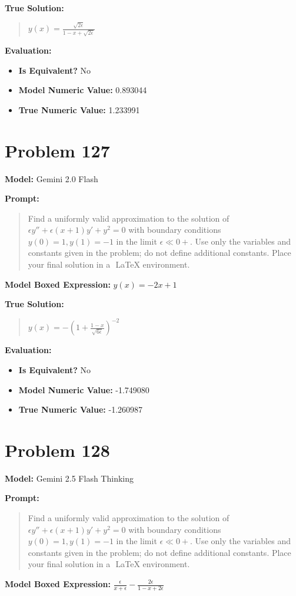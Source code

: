 \documentclass{article}
\begin{document}
{\textbf{True Solution:}
\begin{quote}
$y(x) = \frac{\sqrt{2\epsilon}}{1-x + \sqrt{2\epsilon}}$
\end{quote}

\textbf{Evaluation:}
\begin{itemize}
\item \textbf{Is Equivalent?} No
\item \textbf{Model Numeric Value:} 0.893044
\item \textbf{True Numeric Value:} 1.233991
\end{itemize}
\vspace{1cm}
\section*{Problem 127}
\textbf{Model:} Gemini 2.0 Flash

\textbf{Prompt:}
\begin{quote}
Find a uniformly valid approximation to the solution of $\epsilon y'' + \epsilon (x+1) y' + y^2 = 0$ with boundary conditions $y(0) = 1, y(1) = -1$ in the limit $\epsilon \ll 0+$. Use only the variables and constants given in the problem; do not define additional constants. Place your final solution in a $\boxed{}$ LaTeX environment.
\end{quote}
\textbf{Model Boxed Expression:} $y(x) = -2x+1$

\textbf{True Solution:}
\begin{quote}
$y(x) = -\left(1 + \frac{1-x}{\sqrt{6\epsilon}}\right)^{-2}$
\end{quote}

\textbf{Evaluation:}
\begin{itemize}
\item \textbf{Is Equivalent?} No
\item \textbf{Model Numeric Value:} -1.749080
\item \textbf{True Numeric Value:} -1.260987
\end{itemize}
\vspace{1cm}
\section*{Problem 128}
\textbf{Model:} Gemini 2.5 Flash Thinking

\textbf{Prompt:}
\begin{quote}
Find a uniformly valid approximation to the solution of $\epsilon y'' + \epsilon (x+1) y' + y^2 = 0$ with boundary conditions $y(0) = 1, y(1) = -1$ in the limit $\epsilon \ll 0+$. Use only the variables and constants given in the problem; do not define additional constants. Place your final solution in a $\boxed{}$ LaTeX environment.
\end{quote}
\textbf{Model Boxed Expression:} $\frac{\epsilon}{x+\epsilon} - \frac{2\epsilon}{1-x+2\epsilon}$

}
\end{document}
